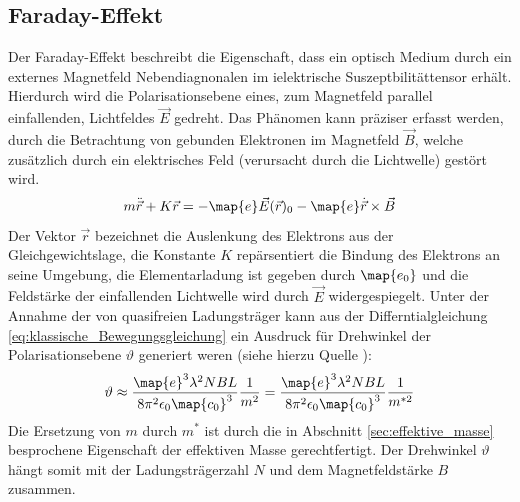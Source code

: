 \subsection{Faraday-Effekt}
Der Faraday-Effekt beschreibt die Eigenschaft, dass ein optisch
Medium durch ein externes Magnetfeld Nebendiagnonalen im ielektrische Suszeptbilitättensor
erhält. Hierdurch wird die Polarisationsebene eines, zum Magnetfeld parallel
einfallenden, Lichtfeldes $\vec{E}$ gedreht. Das Phänomen kann präziser erfasst werden,
durch die Betrachtung von gebunden Elektronen im Magnetfeld $\vec{B}$, welche
zusätzlich durch ein elektrisches Feld (verursacht durch die Lichtwelle) gestört wird.
\begin{equation}
  \label{eq:klassische_Bewegungsgleichung}
  m\ddot{\vec{r}}+K\vec{r}=-\map{e}\vec{E}(\vec{r})_0-\map{e}\dot{\vec{r}}\times\vec{B}
\end{equation}
Der Vektor $\vec{r}$ bezeichnet die Auslenkung des Elektrons aus der Gleichgewichtslage,
die Konstante $K$ repärsentiert die Bindung des Elektrons an seine Umgebung, die Elementarladung
ist gegeben durch $\map{e_0}$ und die Feldstärke der einfallenden Lichtwelle
wird durch $\vec{E}$ widergespiegelt.
Unter der Annahme der von quasifreien Ladungsträger kann
aus der Differntialgleichung \eqref{eq:klassische_Bewegungsgleichung} ein Ausdruck
für Drehwinkel der Polarisationsebene $\vartheta$ generiert weren (siehe hierzu Quelle \cite{anleitungv46}):
\begin{equation}
  \label{eq:drehwinkel}
  \vartheta\approx \frac{\map{e}^3\lambda^2 NBL}{8\pi^2\epsilon_0\map{c_0}^3}\frac{1}{m^2} = \frac{\map{e}^3\lambda^2 NBL}{8\pi^2\epsilon_0\map{c_0}^3}\frac{1}{m^{*2}}
\end{equation}
Die Ersetzung von $m$ durch $m^*$ ist durch die in Abschnitt \ref{sec:effektive_masse}
besprochene Eigenschaft der effektiven Masse gerechtfertigt. Der Drehwinkel $\vartheta$ hängt somit
mit der Ladungsträgerzahl $N$ und dem Magnetfeldstärke $B$ zusammen.

